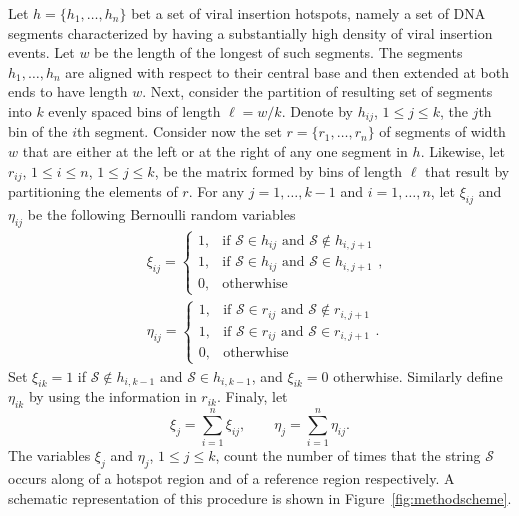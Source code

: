\documentclass{bioinfo}
\begin{document}
Let $h = \{h_1, \ldots, h_n\}$ bet a set of viral insertion hotspots,
namely a set of DNA segments characterized by having a substantially
high density of viral insertion events. Let $w$ be the length of the
longest of such segments. The segments $h_1, \ldots, h_n$ are aligned
with respect to their central base and then extended at both ends to
have length $w$. Next, consider the partition of resulting set of
segments into $k$ evenly spaced bins of length $\ell = w/k$. Denote by
$h_{ij}$, $1 \leq j \leq k$, the $j$th bin of the $i$th
segment. Consider now the set $r= \{r_1, \ldots, r_n\}$ of segments of
width $w$ that are either at the left or at the right of any one
segment in $h$. Likewise, let $r_{ij}$, $1\leq i \leq n$, $1 \leq j
\leq k$, be the matrix formed by bins of length $\ell$ that result by
partitioning  the elements of $r$. For any $j = 1, \ldots, k-1$ and $i
= 1, \ldots, n$, let $\xi_{ij}$ and $\eta_{ij}$ be the following
Bernoulli random variables
\begin{align*}
   &\xi_{ij} = %
    \begin{cases}
     1, &\text{if } \mathcal S \in h_{ij} \text{ and } \mathcal S 
     \notin h_{i,j+1}\\
     1, &\text{if } \mathcal S \in h_{ij} \text{ and } \mathcal S 
     \in h_{i,j+1}\\
     0, &\text{otherwhise}
    \end{cases},\\
   &\eta_{ij} = %
    \begin{cases}
     1, &\text{if } \mathcal S \in r_{ij} \text{ and } \mathcal S 
     \notin r_{i,j+1}\\
     1, &\text{if } \mathcal S \in r_{ij} \text{ and } \mathcal S 
     \in r_{i,j+1}\\
     0, &\text{otherwhise}
    \end{cases}.
\end{align*}
Set $\xi_{ik}  = 1$ if $\mathcal S \notin h_{i,k-1}$ and $\mathcal S
\in h_{i,k-1}$, and $\xi_{ik} = 0$ otherwhise. Similarly define
$\eta_{ik}$ by using the information in $r_{ik}$. Finaly, let 
\[
   \xi_j = \sum_{i=1}^n \xi_{ij}, \qquad 
   \eta_j = \sum_{i=1}^n \eta_{ij}.
\]
The variables $\xi_j$ and $\eta_j$, $1 \leq j \leq k$, count the
number of times that the string $\mathcal S$ occurs along of a hotspot
region and of a reference region respectively.  A schematic representation of  this procedure is shown in Figure~\ref{fig:methodscheme}.
\end{document}
